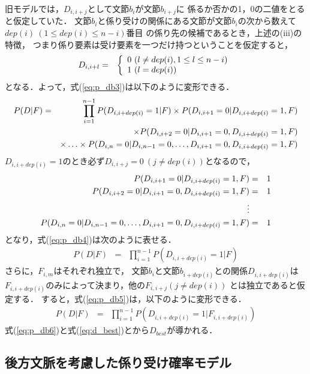 旧モデルでは，$D_{i,i+j}$として文節$b_{i}$が文節$b_{i+j}$に
係るか否かの1，0の二値をとると仮定していた．
文節$b_{i}$と係り受けの関係にある文節が文節$b_{i}$の次から数えて
$dep(i)\ (1\leq dep(i) \leq n-i)$番目
の係り先の候補であるとき，上述の(iii)の特徴，
つまり係り要素は受け要素を一つだけ持つということを仮定すると，
\begin{eqnarray*}
  D_{i,i+l} & = & 
  \left\{
    \begin{array}[c]{l}
      0\ (l\not= dep(i), 1\leq l\leq n-i)\\
      1\ (l = dep(i))
    \end{array}
    \right.
\end{eqnarray*}
となる．よって，式(\ref{eq:p_db3})は以下のように変形できる．
\begin{eqnarray}
  \label{eq:p_db4}
  P(D|F) & = & \prod_{i=1}^{n-1}P(D_{i,i+dep(i)}=1|F)
  \times P(D_{i,i+1}=0|D_{i,i+dep(i)}=1,F)\nonumber\\
  & &  \times P(D_{i,i+2}=0|D_{i,i+1}=0,D_{i,i+dep(i)}=1,F)\nonumber\\
  & &  \times\ldots\times 
  P(D_{i,n}=0|D_{i,n-1}=0, \ldots, D_{i,i+1}=0, D_{i,i+dep(i)}=1,F) \nonumber\\
\end{eqnarray}
$D_{i,i+dep(i)}=1$のとき必ず$D_{i,i+j}=0\ (j\not= dep(i))$となるので，
\clearpage
\begin{eqnarray*}
  P(D_{i,i+1}=0|D_{i,i+dep(i)}=1,F) & = & 1 \\
  P(D_{i,i+2}=0|D_{i,i+1}=0,D_{i,i+dep(i)}=1,F) & = & 1 \\
  \vdots\\
  P(D_{i,n}=0|D_{i,n-1}=0,\ldots,D_{i,i+1}=0,D_{i,i+dep(i)}=1,F) & = & 1
\end{eqnarray*}
となり，式(\ref{eq:p_db4})は次のように表せる．
\begin{eqnarray}
  \label{eq:p_db5}
  P(D|F) & = & \prod_{i=1}^{n-1}P(D_{i,i+dep(i)}=1|F)
\end{eqnarray}
さらに，$F_{i,m}$はそれぞれ独立で，
文節$b_{i}$と文節$b_{i+dep(i)}$との関係$D_{i,i+dep(i)}$は
$F_{i,i+dep(i)}$のみによって決まり，他の$F_{i,i+j} (j\not= dep(i))$
とは独立であると仮定する．
すると，式(\ref{eq:p_db5})は，以下のように変形できる．
\begin{eqnarray}
  \label{eq:p_db6}
  P(D|F) & = & \prod_{i=1}^{n-1}P(D_{i,i+dep(i)}=1|F_{i,i+dep(i)})
\end{eqnarray}
式(\ref{eq:p_db6})と式(\ref{eq:d_best})とから$D_{best}$が導かれる．

\subsection{後方文脈を考慮した係り受け確率モデル}
\label{sec:new_model}

